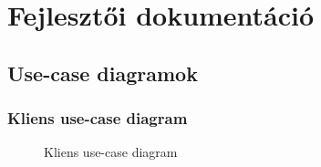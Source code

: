 \chapter{Fejlesztői dokumentáció}
\label{ch:implementation}

\section{Use-case diagramok}

\subsection{Kliens use-case diagram}

\begin{figure}[H]
	\centering
	\caption{Kliens use-case diagram}
	\label{fig:usecaseclient}
\end{figure}

